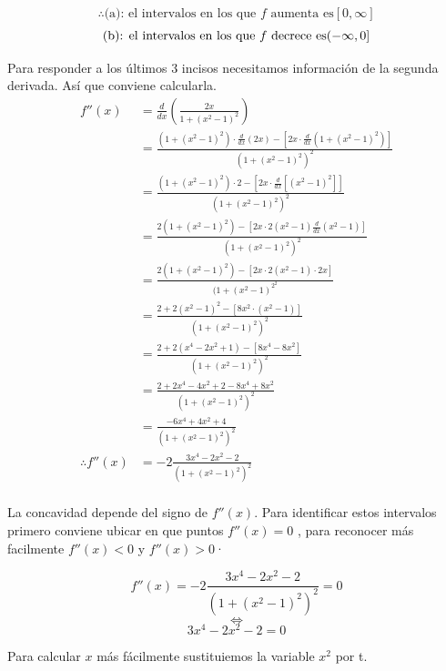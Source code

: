 \documentclass[12pt]{article}
\begin{document}
 \[
 \therefore
 \text{(a):  el intervalos en los que $f$ aumenta es} [0, \infty]
   \]
\[
  \text {(b):  el intervalos en los que $f$ decrece  es}  (-\infty, 0] \\
    \]

    Para responder a los últimos 3 incisos necesitamos información de la segunda derivada. Así que conviene calcularla.
     \begin{equation*}
  \begin{split}
    f''(x)
    &= \frac{d}{dx}( \frac{2x}{ 1+(x^{2}-1)^{2}  } )  \\
    &= \frac{  ( 1+(x^{2}-1)^{2}) \cdot  \frac{d}{dx} (2x) - \left[ 2x \cdot  \frac{d}{dx}   ( 1+(x^{2}-1)^{2})  \right]  }{ (1+(x^{2}-1)^{2} )^{2}  } \\
    &= \frac{  ( 1+(x^{2}-1)^{2}) \cdot  2 - \left[ 2x \cdot  \frac{d}{dx}   [(x^{2}-1)^{2}]  \right]  }{ (1+(x^{2}-1)^{2} )^{2}  } \\
    &= \frac{  2( 1+(x^{2}-1)^{2}) - \left[ 2x \cdot     2(x^{2}-1) \frac{d}{dx} (x^{2}-1)  \right]  }{ (1+(x^{2}-1)^{2} )^{2}  } \\
    &= \frac{  2( 1+(x^{2}-1)^{2}) - \left[ 2x \cdot     2(x^{2}-1) \cdot  2x  \right]  }{ (1+(x^{2}-1)^{2} ^{2}  } \\
    &= \frac{   2+2(x^{2}-1)^{2} - \left[ 8x^{2} \cdot(x^{2}-1)\right]  }{ (1+(x^{2}-1)^{2} )^{2}  } \\
    &= \frac{   2+2(x^{4}-2x^{2}+ 1) - \left[ 8x^{4} - 8x^{2}  \right]  }{ (1+(x^{2}-1)^{2} )^{2}  } \\
    &= \frac{   2+2x^{4}-4x^{2}+ 2 - 8x^{4} + 8x^{2}  }{ (1+(x^{2}-1)^{2} )^{2}  } \\
    &= \frac{-6x^{4} + 4x^{2} +4 }{ (1+(x^{2}-1)^{2} )^{2}  } \\
    \therefore
    f''(x)
    &= -2\frac{3x^{4} - 2x^{2} - 2 }{ (1+(x^{2}-1)^{2} )^{2}  } \\
  \end{split}
     \end{equation*}

     La concavidad depende del signo de $ f''(x)$. Para identificar estos intervalos primero conviene ubicar en que puntos $ f''(x) = 0$ , para reconocer más facilmente $f''(x)<0$ y $f''(x)>0$·

\[ f''(x) = -2\frac{3x^{4} - 2x^{2} - 2 }{ (1+(x^{2}-1)^{2} )^{2}  } = 0  \]
\[ \iff \]
\[ 3x^{4} - 2x^{2} - 2 = 0 \]

Para calcular  $x$ más fácilmente sustituiemos la variable $x^{2}$ por t.
\end{document}
